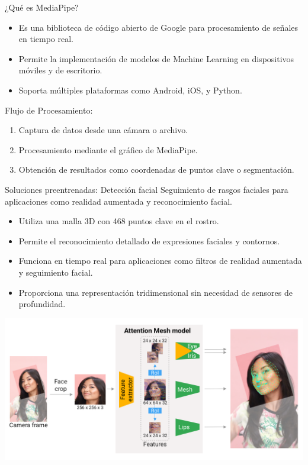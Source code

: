
\begin{frame}{¿Qué es MediaPipe?}
    \begin{itemize}
        \item Es una biblioteca de código abierto de Google para procesamiento de señales en tiempo real.
        \item Permite la implementación de modelos de Machine Learning en dispositivos móviles y de escritorio.
        \item Soporta múltiples plataformas como Android, iOS, y Python.
    \end{itemize}
    Flujo de Procesamiento:
    \begin{enumerate}
        \item Captura de datos desde una cámara o archivo.
        \item Procesamiento mediante el gráfico de MediaPipe.
        \item Obtención de resultados como coordenadas de puntos clave o segmentación.
    \end{enumerate}

\end{frame}

\begin{frame}{Soluciones preentrenadas: Detección facial}
    Seguimiento de rasgos faciales para aplicaciones como realidad aumentada y reconocimiento facial.
     \begin{itemize}
        \item Utiliza una malla 3D con 468 puntos clave en el rostro.
        \item Permite el reconocimiento detallado de expresiones faciales y contornos.
        \item Funciona en tiempo real para aplicaciones como filtros de realidad aumentada y seguimiento facial.
        \item Proporciona una representación tridimensional sin necesidad de sensores de profundidad.
    \end{itemize}
    \begin{center}
        \includegraphics[width=0.6\linewidth]{01_MediaPipe/fase_mesh_detection.png}
    \end{center}
\end{frame}

